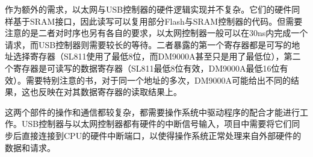 作为额外的需求，以太网与USB控制器的硬件逻辑实现并不复杂。它们的硬件同样基于SRAM接口，因此读写可以复用部分Flash与SRAM控制器的代码。但需要注意的是二者对时序也另有各自的要求，以太网控制器一般可以在30ns内完成一个请求，而USB控制器则需要较长的等待。二者暴露的第一个寄存器都是可写的地址选择寄存器（SL811使用了最低8位，而DM9000A甚至只是用了最低位），第二个寄存器是可读写的数据寄存器（SL811最低8位有效，DM9000A最低16位有效）。需要特别注意的书，对于同一个地址的多次，DM9000A可能给出不同的结果，这也反映在对其数据寄存器的读取结果上。

这两个部件的操作和通信都较复杂，都需要操作系统中驱动程序的配合才能进行工作。USB控制器与以太网控制器都有硬件的中断信号输入，项目中需要将它们同步后直接连接到CPU的硬件中断端口，以使得操作系统正常处理来自外部硬件的数据和请求。